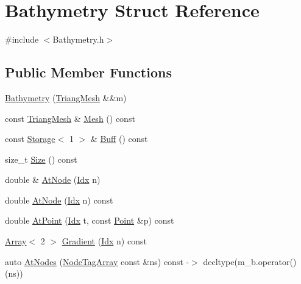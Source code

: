 \hypertarget{structBathymetry}{}\section{Bathymetry Struct Reference}
\label{structBathymetry}


{\ttfamily \#include $<$Bathymetry.\+h$>$}

\subsection*{Public Member Functions}
\begin{DoxyCompactItemize}
\item 
\hyperlink{structBathymetry_af29ee7c05a6c15897296235a6119c841}{Bathymetry} (\hyperlink{structTriangMesh}{Triang\+Mesh} \&\&m)
\item 
const \hyperlink{structTriangMesh}{Triang\+Mesh} \& \hyperlink{structBathymetry_a2344e707a6092a2fe753d9d983675270}{Mesh} () const
\item 
const \hyperlink{Includes_8h_ae7d375db701e28425a3faea2827f134b}{Storage}$<$ 1 $>$ \& \hyperlink{structBathymetry_ad0bff54b04bec3c1ef57edde852bf26c}{Buff} () const
\item 
size\+\_\+t \hyperlink{structBathymetry_a9e37db46f1707e16a291e45922201ba7}{Size} () const
\item 
double \& \hyperlink{structBathymetry_a947fa04cebe8530b5359f4676ecc95ae}{At\+Node} (\hyperlink{Includes_8h_ae78891cd308078a2f5f9e7193065c805}{Idx} n)
\item 
double \hyperlink{structBathymetry_a7b6e4230a197b6796d9bc92045b54cdd}{At\+Node} (\hyperlink{Includes_8h_ae78891cd308078a2f5f9e7193065c805}{Idx} n) const
\item 
double \hyperlink{structBathymetry_a6f2e5f91978fbc5ceac899ad1bb97133}{At\+Point} (\hyperlink{Includes_8h_ae78891cd308078a2f5f9e7193065c805}{Idx} t, const \hyperlink{PointOperations_8h_a71a59e5a162c0274a9af106af82cf198}{Point} \&p) const
\item 
\hyperlink{Includes_8h_abd9de33944f934950000c3929e14ad8d}{Array}$<$ 2 $>$ \hyperlink{structBathymetry_a7d7ef1d3154c6236acedb0faa5ab9a76}{Gradient} (\hyperlink{Includes_8h_ae78891cd308078a2f5f9e7193065c805}{Idx} n) const
\item 
auto \hyperlink{structBathymetry_a85c33e305c755d3d291ac382817dcac5}{At\+Nodes} (\hyperlink{TriangMesh_8h_aec6495913a1e6aad9c6535102a4dd953}{Node\+Tag\+Array} const \&ns) const -\/$>$ decltype(m\+\_\+b.\+operator()(ns))
\end{DoxyCompactItemize}
